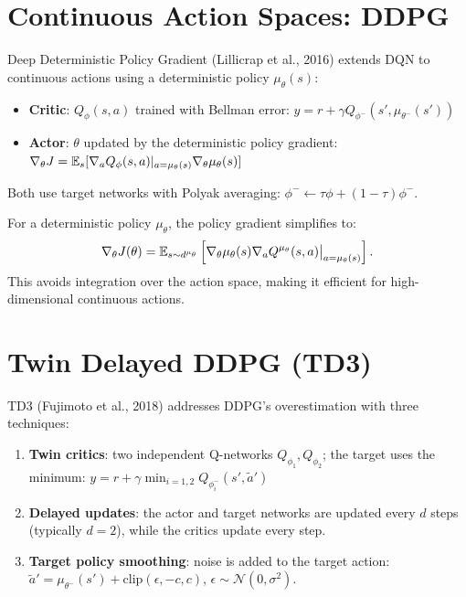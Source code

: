\section{Continuous Action Spaces: DDPG}
\label{sec:ddpg}

\begin{definition}[DDPG]
Deep Deterministic Policy Gradient (Lillicrap et al., 2016) extends DQN
to continuous actions using a deterministic policy $\mu_\theta(s)$:
\begin{itemize}
    \item \textbf{Critic}: $Q_\phi(s,a)$ trained with Bellman error:
    $y = r + \gamma Q_{\phi^-}(s', \mu_{\theta^-}(s'))$
    \item \textbf{Actor}: $\theta$ updated by the deterministic policy
    gradient:
    $\nabla_\theta J = \mathbb{E}_s[\nabla_a Q_\phi(s,a)|_{a=\mu_\theta(s)}
    \nabla_\theta \mu_\theta(s)]$
\end{itemize}
Both use target networks with Polyak averaging:
$\phi^- \leftarrow \tau \phi + (1-\tau)\phi^-$.
\end{definition}

\begin{theorem}
For a deterministic policy $\mu_\theta$, the policy gradient simplifies to:
\[
    \nabla_\theta J(\theta) = \mathbb{E}_{s \sim d^{\mu_\theta}}\left[
    \nabla_\theta \mu_\theta(s) \nabla_a Q^{\mu_\theta}(s,a)\big|_{a=\mu_\theta(s)}
    \right].
\]
This avoids integration over the action space, making it efficient for
high-dimensional continuous actions.
\end{theorem}

\section{Twin Delayed DDPG (TD3)}
\label{sec:td3}

\begin{definition}[TD3]
TD3 (Fujimoto et al., 2018) addresses DDPG's overestimation with three
techniques:
\begin{enumerate}
    \item \textbf{Twin critics}: two independent Q-networks $Q_{\phi_1},
    Q_{\phi_2}$; the target uses the minimum:
    $y = r + \gamma \min_{i=1,2} Q_{\phi_i^-}(s', \tilde{a}')$
    \item \textbf{Delayed updates}: the actor and target networks are
    updated every $d$ steps (typically $d=2$), while the critics update
    every step.
    \item \textbf{Target policy smoothing}: noise is added to the target
    action: $\tilde{a}' = \mu_{\theta^-}(s') + \text{clip}(\epsilon, -c, c)$,
    $\epsilon \sim \mathcal{N}(0, \sigma^2)$.
\end{enumerate}
\end{definition}

